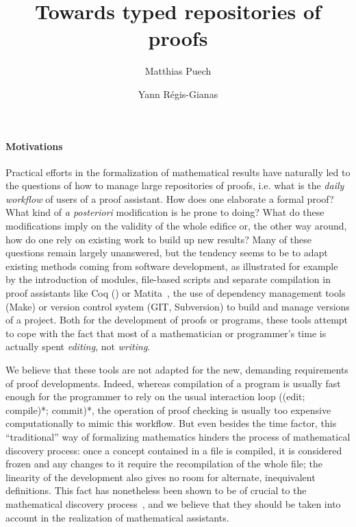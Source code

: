 \documentclass{article}
\title{Towards typed repositories of proofs}
\author{Matthias Puech \and Yann Régis-Gianas}
\date{}
\newcommand{\remplan}[1]{\noindent\textcolor{bwblue}{$\triangleright$ \textbf{#1}}}
\renewcommand{\remplan}[1]{}
\begin{document}
\maketitle

\paragraph{Motivations}

\remplan{Motivations générales}

Practical efforts in the formalization of mathematical results have
naturally led to the questions of how to manage large repositories of
proofs, i.e. what is the \emph{daily workflow} of users of a proof
assistant. How does one elaborate a formal proof? What kind of \emph{a
  posteriori} modification is he prone to doing? What do these
modifications imply on the validity of the whole edifice or, the other
way around, how do one rely on existing work to build up new results?
Many of these questions remain largely unanswered, but the tendency
seems to be to adapt existing methods coming from software
development, as illustrated for example by the introduction of
modules, file-based scripts and separate compilation in proof
assistants like \textsf{Coq} ({\cite{CoqDocWeb}}) or
\textsf{Matita}~{\cite{Asperti06userinteraction}}, the use of
dependency management tools (\textsf{Make}) or version control system
(\textsf{GIT}, \textsf{Subversion}) to build and manage versions of a
project. Both for the development of proofs or programs, these tools
attempt to cope with the fact that most of a mathematician or
programmer's time is actually spent \emph{editing}, not
\emph{writing}.

We believe that these tools are not adapted for the new, demanding
requirements of proof developments. Indeed, whereas compilation of a
program is usually fast enough for the programmer to rely on the usual
interaction loop ((edit; compile)*; commit)*, the operation of proof
checking is usually too expensive computationally to mimic this
workflow. But even besides the time factor, this ``traditional'' way
of formalizing mathematics hinders the process of mathematical
discovery process: once a concept contained in a file is compiled, it
is considered frozen and any changes to it require the recompilation
of the whole file; the linearity of the development also gives no room
for alternate, inequivalent definitions. This fact has nonetheless
been shown to be of crucial to the mathematical discovery
process~\cite{lakatos1964proofs}, and we believe that they should be
taken into account in the realization of mathematical assistants.
\end{document}
